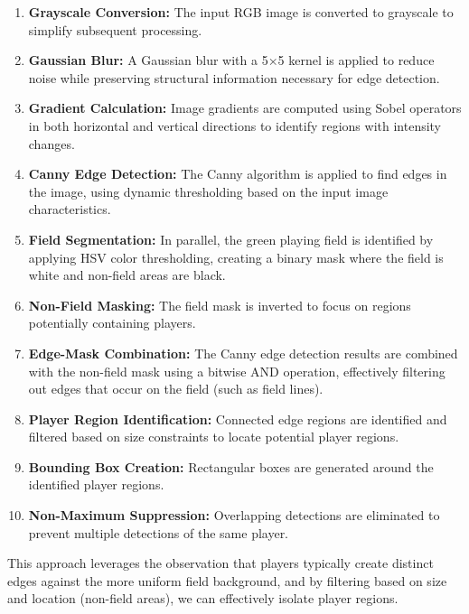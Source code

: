 \documentclass[10pt,twocolumn,letterpaper]{article}
\begin{document}
\begin{enumerate}
    \item \textbf{Grayscale Conversion:} The input RGB image is converted to grayscale to simplify subsequent processing.
    
    \item \textbf{Gaussian Blur:} A Gaussian blur with a 5×5 kernel is applied to reduce noise while preserving structural information necessary for edge detection.
    
    \item \textbf{Gradient Calculation:} Image gradients are computed using Sobel operators in both horizontal and vertical directions to identify regions with intensity changes.
    
    \item \textbf{Canny Edge Detection:} The Canny algorithm is applied to find edges in the image, using dynamic thresholding based on the input image characteristics.
    
    \item \textbf{Field Segmentation:} In parallel, the green playing field is identified by applying HSV color thresholding, creating a binary mask where the field is white and non-field areas are black.
    
    \item \textbf{Non-Field Masking:} The field mask is inverted to focus on regions potentially containing players.
    
    \item \textbf{Edge-Mask Combination:} The Canny edge detection results are combined with the non-field mask using a bitwise AND operation, effectively filtering out edges that occur on the field (such as field lines).
    
    \item \textbf{Player Region Identification:} Connected edge regions are identified and filtered based on size constraints to locate potential player regions.
    
    \item \textbf{Bounding Box Creation:} Rectangular boxes are generated around the identified player regions.
    
    \item \textbf{Non-Maximum Suppression:} Overlapping detections are eliminated to prevent multiple detections of the same player.
\end{enumerate}

This approach leverages the observation that players typically create distinct edges against the more uniform field background, and by filtering based on size and location (non-field areas), we can effectively isolate player regions.
\end{document}
